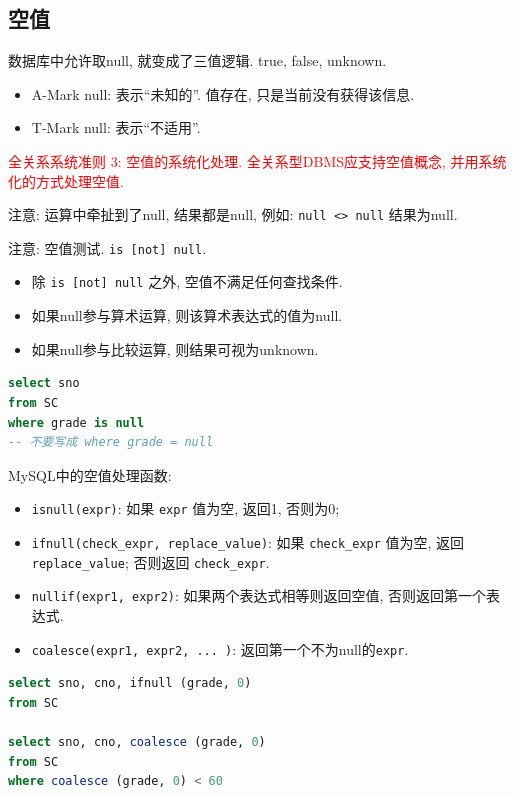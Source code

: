 \subsection{空值}

数据库中允许取null, 就变成了三值逻辑. true, false, unknown.
\begin{itemize}
  \item A-Mark null: 表示“未知的”. 值存在, 只是当前没有获得该信息.
  \item T-Mark null: 表示“不适用”.
\end{itemize}

\textcolor{red}{全关系系统准则 3: 空值的系统化处理. 全关系型DBMS应支持空值概念, 并用系统化的方式处理空值.}

注意: 运算中牵扯到了null, 结果都是null, 例如: \verb|null <> null| 结果为null.

注意: 空值测试. \verb|is [not] null|.
\begin{itemize}
  \item 除 \verb|is [not] null| 之外, 空值不满足任何查找条件.
  \item 如果null参与算术运算, 则该算术表达式的值为null.
  \item 如果null参与比较运算, 则结果可视为unknown.
\end{itemize}

\begin{lstlisting}[language=SQL]
select sno
from SC
where grade is null
-- 不要写成 where grade = null
\end{lstlisting}

MySQL中的空值处理函数:
\begin{itemize}
  \item \verb|isnull(expr)|: 如果 \verb|expr| 值为空, 返回1, 否则为0;
  \item \verb|ifnull(check_expr, replace_value)|: 如果 \verb|check_expr| 值为空, 返回\verb|replace_value|; 否则返回 \verb|check_expr|.
  \item \verb|nullif(expr1, expr2)|: 如果两个表达式相等则返回空值, 否则返回第一个表达式.
  \item \verb|coalesce(expr1, expr2, ... )|: 返回第一个不为null的\verb|expr|.
\end{itemize}

\begin{lstlisting}[language=SQL]
select sno, cno, ifnull (grade, 0)
from SC

select sno, cno, coalesce (grade, 0)
from SC
where coalesce (grade, 0) < 60
\end{lstlisting}

